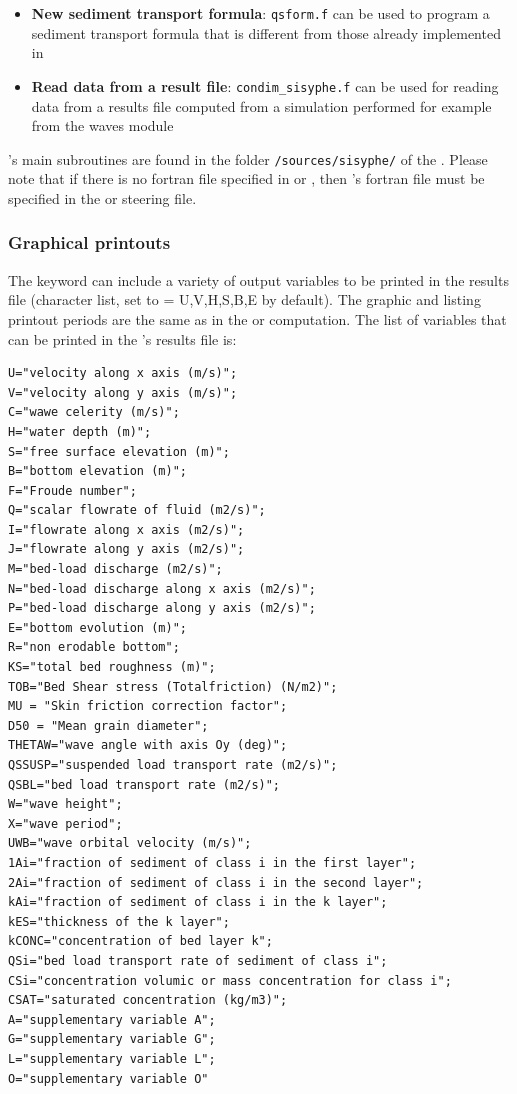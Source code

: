 {\begin{itemize}
\item \textbf{New sediment transport formula}: \texttt{qsform.f} can be used to program a sediment transport formula that is different from those already implemented in \sisyphe{}

\item \textbf{Read data from a result file}: \texttt{condim\_sisyphe.f} can be used for reading data from a results file computed from a simulation performed for example from the waves module \tomawac{}

\end{itemize}

\sisyphe{}'s main subroutines are found in the folder \texttt{/sources/sisyphe/} of the \telemacsystem{}. Please note that if there is no fortran file specified in  or , then \sisyphe's fortran file must be specified in the  or  steering file.

\pagebreak

\subsubsection{Graphical printouts}
The keyword  can include a variety of output variables to be printed in the results file (character list, set to {\ttfamily = U,V,H,S,B,E} by default). The graphic and listing printout periods are the same as in the  or  computation. The list of variables that can be printed in the \sisyphe{}'s results file is:
\begin{lstlisting}[frame=trBL]
U="velocity along x axis (m/s)";
V="velocity along y axis (m/s)";
C="wawe celerity (m/s)";
H="water depth (m)";
S="free surface elevation (m)";
B="bottom elevation (m)";
F="Froude number";
Q="scalar flowrate of fluid (m2/s)";
I="flowrate along x axis (m2/s)";
J="flowrate along y axis (m2/s)";
M="bed-load discharge (m2/s)";
N="bed-load discharge along x axis (m2/s)";
P="bed-load discharge along y axis (m2/s)";
E="bottom evolution (m)";
R="non erodable bottom";
KS="total bed roughness (m)";
TOB="Bed Shear stress (Totalfriction) (N/m2)";
MU = "Skin friction correction factor";
D50 = "Mean grain diameter";
THETAW="wave angle with axis Oy (deg)";
QSSUSP="suspended load transport rate (m2/s)";
QSBL="bed load transport rate (m2/s)";
W="wave height";
X="wave period";
UWB="wave orbital velocity (m/s)";
1Ai="fraction of sediment of class i in the first layer";
2Ai="fraction of sediment of class i in the second layer";
kAi="fraction of sediment of class i in the k layer";
kES="thickness of the k layer";
kCONC="concentration of bed layer k";
QSi="bed load transport rate of sediment of class i";
CSi="concentration volumic or mass concentration for class i";
CSAT="saturated concentration (kg/m3)";
A="supplementary variable A";
G="supplementary variable G";
L="supplementary variable L";
O="supplementary variable O"
\end{lstlisting}

}
